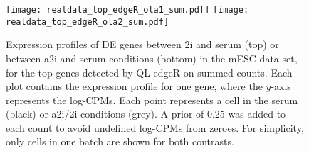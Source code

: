 \documentclass{article}
\begin{document}
\begin{figure}[p]
    \begin{center}
        \texttt{[image: realdata\_top\_edgeR\_ola1\_sum.pdf]}
        \texttt{[image: realdata\_top\_edgeR\_ola2\_sum.pdf]}
    \end{center}
\caption{
    Expression profiles of DE genes between 2i and serum (top) or between a2i and serum conditions (bottom) in the mESC data set, 
        for the top genes detected by QL edgeR on summed counts.
    Each plot contains the expression profile for one gene, where the $y$-axis represents the log-CPMs.
    Each point represents a cell in the serum (black) or a2i/2i conditions (grey).
    A prior of 0.25 was added to each count to avoid undefined log-CPMs from zeroes.
    For simplicity, only cells in one batch are shown for both contrasts.
}
\label{fig:realdata}
\end{figure}



 
\end{document}
